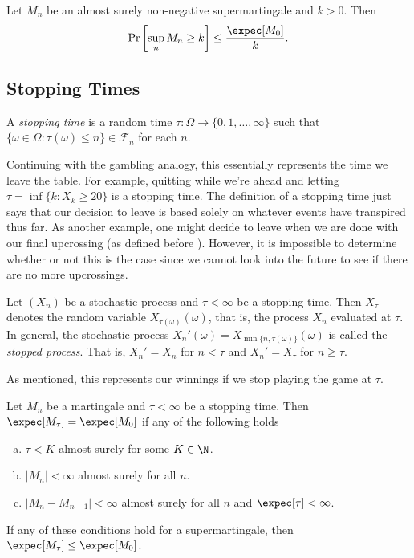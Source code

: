 		\begin{lemma}
			Let $M_n$ be an almost surely non-negative supermartingale and $k>0$. Then
			\[ \Pr\left[\sup_n M_n \geq k\right] \leq \frac{\expec[M_0]}{k}. \]
		\end{lemma}

		\subsection{Stopping Times}

		\begin{definition}
			A \textit{stopping time} is a random time $\tau:\Omega\to\{0,1,\ldots,\infty\}$ such that $\{\omega\in\Omega : \tau(\omega)\leq n\}\in\mathcal{F}_n$ for each $n$.
		\end{definition}

		Continuing with the gambling analogy, this essentially represents the time we leave the table. For example, quitting while we're ahead and letting $\tau=\inf\{k : X_k \geq 20\}$ is a stopping time. The definition of a stopping time just says that our decision to leave is based solely on whatever events have transpired thus far. As another example, one might decide to leave when we are done with our final upcrossing (as defined before ). However, it is impossible to determine whether or not this is the case since we cannot look into the future to see if there are no more upcrossings.

		\begin{definition}
			Let $(X_n)$ be a stochastic process and $\tau<\infty$ be a stopping time. Then $X_\tau$ denotes the random variable $X_{\tau(\omega)}(\omega)$, that is, the process $X_n$ evaluated at $\tau$. In general, the stochastic process $X_n'(\omega) = X_{\min\{n,\tau(\omega)\}}(\omega)$ is called the \textit{stopped process}. That is, $X_n'=X_n$ for $n<\tau$ and $X_n' = X_\tau$ for $n\geq\tau$.
		\end{definition}

		As mentioned, this represents our winnings if we stop playing the game at $\tau$.

		\begin{lemma}
			\label{optional stopping}
			Let $M_n$ be a martingale and $\tau<\infty$ be a stopping time. Then $\expec[M_\tau]=\expec[M_0]$ if any of the following holds
			\begin{enumerate}[(a)]
				\item $\tau<K$ almost surely for some $K\in\N$.
				\item $|M_n|<\infty$ almost surely for all $n$.
				\item $|M_n-M_{n-1}|<\infty$ almost surely for all $n$ and $\expec[\tau]<\infty$.
			\end{enumerate}
			If any of these conditions hold for a supermartingale, then $\expec[M_\tau]\leq\expec[M_0]$.
		\end{lemma}

